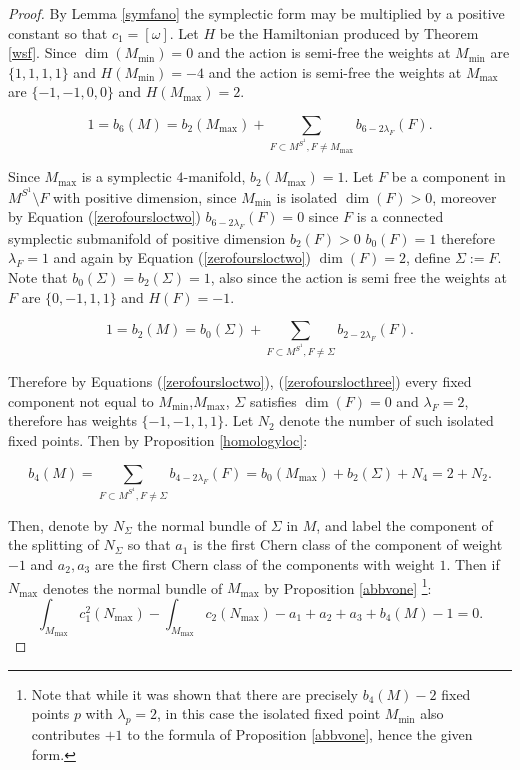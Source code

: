 \documentclass[12pt]{article}
\begin{document}
\begin{proof}
By Lemma \ref{symfano} the symplectic form may be multiplied by a positive constant so that $c_1 = [\omega]$. Let $H$ be the Hamiltonian produced by Theorem \ref{wsf}. Since $\dim(M_{\min}) = 0$ and the action is semi-free the weights at $M_{\min}$ are $\{1,1,1,1\}$ and $H(M_{\min}) = -4$ and the action is semi-free the weights at $M_{\max}$ are $\{-1,-1,0,0\}$  and $H(M_{\max}) = 2$. 

\begin{equation} \label{zerofoursloctwo}  
1= b_{6}(M) = b_{2}(M_{\max}) +  \sum_{F \subset M^{S^1}, F \neq M_{\max}} b_{6-2\lambda_{F}}(F).  \end{equation}

Since $M_{\max}$ is a symplectic $4$-manifold, $b_{2}(M_{\max})=1$.  Let $F$ be a component in $M^{S^1} \setminus F$ with positive dimension, since $M_{\min}$ is isolated $\dim(F)>0$, moreover by Equation (\ref{zerofoursloctwo})  $b_{6-2\lambda_{F}}(F)=0$ since $F$ is a connected symplectic submanifold of positive dimension $b_{2}(F)>0$ $b_{0}(F)=1$  therefore $\lambda_{F}=1$ and again by Equation  (\ref{zerofoursloctwo}) $\dim(F)=2$, define $\Sigma := F$. Note that $b_{0}(\Sigma) = b_{2}(\Sigma) =1$, also since the action is semi free the weights at $F$ are $\{0,-1,1,1\}$ and $H(F)=-1$.


\begin{equation} \label{zerofourslocthree}  
1= b_{2}(M) = b_{0}(\Sigma) +  \sum_{F \subset M^{S^1}, F \neq \Sigma} b_{2-2\lambda_{F}}(F).  \end{equation}

Therefore by Equations (\ref{zerofoursloctwo}), (\ref{zerofourslocthree}) every fixed component not equal to $M_{\min}$,$M_{\max}$, $\Sigma$ satisfies $\dim(F) = 0 $ and $\lambda_{F} = 2$, therefore has weights $\{-1,-1,1,1\}$. Let $N_{2}$ denote the number of such isolated fixed points. Then by Proposition \ref{homologyloc}:

\begin{equation} \label{zerofourslocfour}  
b_{4}(M) =  \sum_{F \subset M^{S^1}, F \neq \Sigma} b_{4-2\lambda_{F}}(F) = b_{0}(M_{\max}) + b_{2}(\Sigma) + N_{4} = 2 + N_{2}.  \end{equation}

Then, denote by $N_{\Sigma}$ the normal bundle of $\Sigma$ in $M$, and label the component of the splitting of $N_{\Sigma}$ so that $a_1$ is the first Chern class of the component of weight $-1$ and $a_2,a_3$ are the first Chern class of the components with weight $1$. Then if $N_{\max}$ denotes the normal bundle of $M_{\max}$  by Proposition \ref{abbvone} \footnote{Note that while it was shown that there are precisely $b_{4}(M)-2$ fixed points $p$ with $\lambda_p=2$, in this case the isolated fixed point $M_{\min}$ also contributes $+1$ to the formula of Proposition \ref{abbvone}, hence the given form.}:  \begin{equation}\label{zerofoursurloc} \int_{M_{\max}} c_{1}^2(N_{\max}) - \int_{M_{\max}} c_{2}(N_{\max}) -a_1 + a_2 +a_3 + b_4(M) - 1 = 0. \end{equation}


\end{proof}
\end{document}
